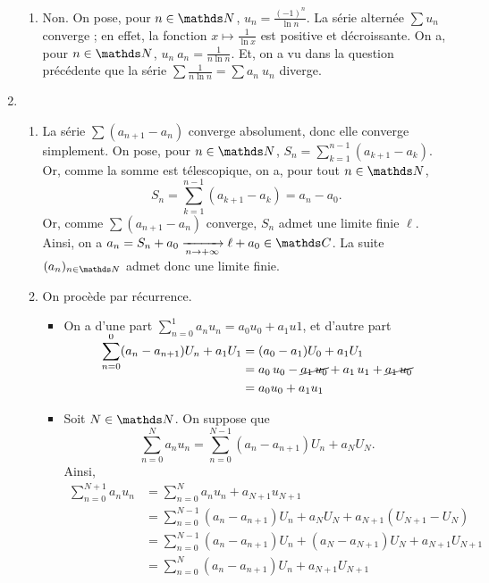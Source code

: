 \documentclass[a4paper]{article}
\begin{document}
\begin{enumerate}
\begin{enumerate}
				\item Non. On pose, pour $n \in \N$, $u_n = \frac{(-1)^n}{\ln n}$. La série alternée $\sum u_n$\/ converge ; en effet, la fonction $x \mapsto \frac{1}{\ln x}$\/ est positive et décroissante. On a, pour $n \in \N$, $u_n\:a_n = \frac{1}{n \ln n}$. Et, on a vu dans la question précédente que la série $\sum \frac{1}{n \ln n} = \sum a_n\:u_n$\/ diverge.
			\end{enumerate}
		\item
			\begin{enumerate}
				\item La série $\sum (a_{n+1} - a_n)$\/ converge absolument, donc elle converge simplement. On pose, pour $n \in \N$, $S_n = \sum_{k=1}^{n-1} (a_{k+1} - a_k)$. Or, comme la somme est télescopique, on a, pour tout $n \in \N$, \[
						S_n = \sum_{k=1}^{n-1} (a_{k+1} -a_k) = a_n - a_0
					.\] Or, comme $\sum (a_{n+1} - a_n)$\/ converge, $S_n$\/ admet une limite finie $\ell$. Ainsi, on a $a_n = S_n + a_0 \tendsto{n\to +\infty} \ell + a_0 \in \C$. La suite $(a_n)_{n\in\N}$\/ admet donc une limite finie.
				\item On procède par récurrence.
					\begin{itemize}
						\item On a d'une part $\sum_{n=0}^1 a_n u_n = a_0 u_0 + a_1 u 1$, et d'autre part
							\begin{align*}
								\smash{\sum_{n=0}^0} (a_n- a_{n+1}) U_n + a_1 U_1 &= (a_0 - a_1) U_0 + a_1 U_1\\
								&= a_0\,u_0 - \cancel{a_1\,u_0} + a_1\,u_1 + \cancel{a_1\,u_0} \\
								&= a_0 u_0 + a_1 u_1 \\
							\end{align*}
						\item Soit $N \in \N$. On suppose que \[
								\sum_{n=0}^N a_n u_n = \sum_{n=0}^{N-1}(a_n - a_{n+1}) U_n + a_N U_N
							.\] Ainsi,
							\begin{align*}
								\sum_{n=0}^{N+1} a_n u_n &= \sum_{n=0}^N a_n u_n + a_{N+1}u_{N+1}\\
								&= \sum_{n=0}^{N-1}(a_n - a_{n+1}) U_n + a_N U_N + a_{N+1} (U_{N+1} - U_N)\\
								&= \sum_{n=0}^{N-1}(a_n - a_{n+1}) U_n + (a_N - a_{N+1}) U_N + a_{N+1} U_{N+1}\\
								&= \sum_{n=0}^N (a_n - a_{n+1}) U_n + a_{N+1} U_{N+1}\\
							\end{align*}
					\end{itemize}

\end{enumerate}
\end{enumerate}
\end{document}
